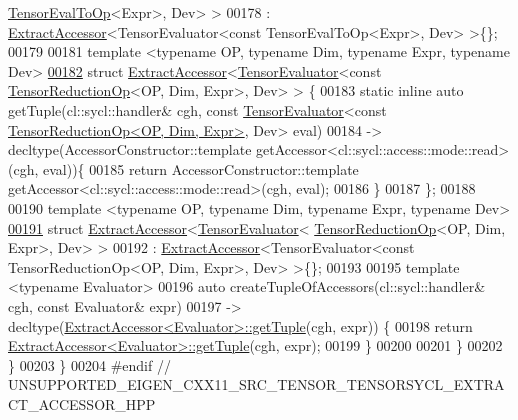 \begin{DoxyCode}
      \hyperlink{class_eigen_1_1_tensor_eval_to_op}{TensorEvalToOp}<Expr>, Dev> >
00178 : \hyperlink{struct_eigen_1_1_tensor_sycl_1_1internal_1_1_extract_accessor}{ExtractAccessor}<TensorEvaluator<const TensorEvalToOp<Expr>, Dev> >\{\};
00179 
00181 \textcolor{keyword}{template} <\textcolor{keyword}{typename} OP, \textcolor{keyword}{typename} Dim, \textcolor{keyword}{typename} Expr, \textcolor{keyword}{typename} Dev>
\hyperlink{struct_eigen_1_1_tensor_sycl_1_1internal_1_1_extract_accessor_3_01_tensor_evaluator_3_01const_017b84cc42bd938fc0857672c2d814fbbd}{00182} \textcolor{keyword}{struct }\hyperlink{struct_eigen_1_1_tensor_sycl_1_1internal_1_1_extract_accessor}{ExtractAccessor}<\hyperlink{struct_eigen_1_1_tensor_evaluator}{TensorEvaluator}<const 
      \hyperlink{class_eigen_1_1_tensor_reduction_op}{TensorReductionOp}<OP, Dim, Expr>, Dev> > \{
00183   \textcolor{keyword}{static} \textcolor{keyword}{inline} \textcolor{keyword}{auto} getTuple(cl::sycl::handler& cgh, \textcolor{keyword}{const} \hyperlink{struct_eigen_1_1_tensor_evaluator}{TensorEvaluator}<\textcolor{keyword}{const} 
      \hyperlink{class_eigen_1_1_tensor_reduction_op}{TensorReductionOp<OP, Dim, Expr>}, Dev> eval)
00184   -> decltype(AccessorConstructor::template getAccessor<cl::sycl::access::mode::read>(cgh, eval))\{
00185     \textcolor{keywordflow}{return} AccessorConstructor::template getAccessor<cl::sycl::access::mode::read>(cgh, eval);
00186   \}
00187 \};
00188 
00190 \textcolor{keyword}{template} <\textcolor{keyword}{typename} OP, \textcolor{keyword}{typename} Dim, \textcolor{keyword}{typename} Expr, \textcolor{keyword}{typename} Dev>
\hyperlink{struct_eigen_1_1_tensor_sycl_1_1internal_1_1_extract_accessor_3_01_tensor_evaluator_3_01_tensor_2b84b99009c752b26bb930d0598625bb}{00191} \textcolor{keyword}{struct }\hyperlink{struct_eigen_1_1_tensor_sycl_1_1internal_1_1_extract_accessor}{ExtractAccessor}<\hyperlink{struct_eigen_1_1_tensor_evaluator}{TensorEvaluator}<
      \hyperlink{class_eigen_1_1_tensor_reduction_op}{TensorReductionOp}<OP, Dim, Expr>, Dev> >
00192 : \hyperlink{struct_eigen_1_1_tensor_sycl_1_1internal_1_1_extract_accessor}{ExtractAccessor}<TensorEvaluator<const TensorReductionOp<OP, Dim, Expr>, Dev> >\{\};
00193 
00195 \textcolor{keyword}{template} <\textcolor{keyword}{typename} Evaluator>
00196 \textcolor{keyword}{auto} createTupleOfAccessors(cl::sycl::handler& cgh, \textcolor{keyword}{const} Evaluator& expr)
00197 -> decltype(\hyperlink{struct_eigen_1_1_tensor_sycl_1_1internal_1_1_extract_accessor}{ExtractAccessor<Evaluator>::getTuple}(cgh, expr)) \{
00198   \textcolor{keywordflow}{return} \hyperlink{struct_eigen_1_1_tensor_sycl_1_1internal_1_1_extract_accessor}{ExtractAccessor<Evaluator>::getTuple}(cgh, expr);
00199 \}
00200 
00201 \} 
00202 \} 
00203 \} 
00204 \textcolor{preprocessor}{#endif  // UNSUPPORTED\_EIGEN\_CXX11\_SRC\_TENSOR\_TENSORSYCL\_EXTRACT\_ACCESSOR\_HPP}
\end{DoxyCode}
